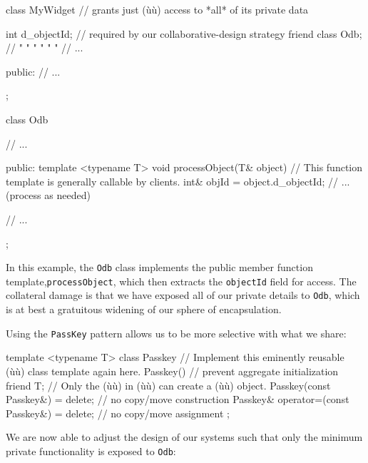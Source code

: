 \begin{emcppslisting}
class MyWidget  // grants just (ù{}ù) access to *all* of its private data
{
    int d_objectId;    // required by our collaborative-design strategy
    friend class Odb;  //    "     "   "        "        "       "
    // ...

public:
    // ...
};

class Odb
{
    // ...

public:
    template <typename T>
    void processObject(T& object)
        // This function template is generally callable by clients.
    {
        int& objId = object.d_objectId;
        // ... (process as needed)
    }

    // ...
};
\end{emcppslisting}

\noindent In this example, the \lstinline!Odb! class implements the public member
function template,\linebreak[4] \lstinline!processObject!, which then extracts the
\lstinline!objectId! field for access. The collateral damage is that we
have exposed all of our private details to \lstinline!Odb!, which is at
best a gratuitous widening of our sphere of encapsulation.

Using the \lstinline!PassKey! pattern allows us to be more selective with
what we share:

\begin{emcppslisting}[emcppsbatch=e3]
template <typename T>
class Passkey
    // Implement this eminently reusable (ù{}ù) class template again here.
{
    Passkey() { }  // prevent aggregate initialization
    friend T;      // Only the (ù{}ù) in (ù{}ù) can create a (ù{}ù) object.
    Passkey(const Passkey&) = delete;             // no copy/move construction
    Passkey& operator=(const Passkey&) = delete;  // no copy/move assignment
};
\end{emcppslisting}

\noindent We are now able to adjust the design of our systems such that only the
minimum private functionality is exposed to \lstinline!Odb!:

